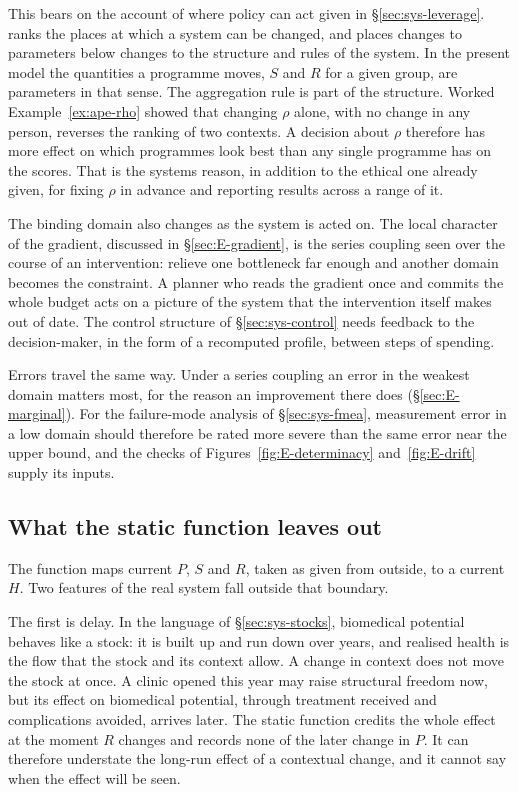 This bears on the account of where policy can act given in
\S\ref{sec:sys-leverage}. \citet{meadows_1999} ranks the places at which a
system can be changed, and places changes to parameters below changes to the
structure and rules of the system. In the present model the quantities a
programme moves, $S$ and $R$ for a given group, are parameters in that sense.
The aggregation rule is part of the structure. Worked Example~\ref{ex:ape-rho}
showed that changing $\rho$ alone, with no change in any person, reverses the
ranking of two contexts. A decision about $\rho$ therefore has more effect on
which programmes look best than any single programme has on the scores. That
is the systems reason, in addition to the ethical one already given, for fixing
$\rho$ in advance and reporting results across a range of it.

The binding domain also changes as the system is acted on. The local character
of the gradient, discussed in \S\ref{sec:E-gradient}, is the series coupling
seen over the course of an intervention: relieve one bottleneck far enough and
another domain becomes the constraint. A planner who reads the gradient once
and commits the whole budget acts on a picture of the system that the
intervention itself makes out of date. The control structure of
\S\ref{sec:sys-control} needs feedback to the decision-maker, in the form of a
recomputed profile, between steps of spending.

Errors travel the same way. Under a series coupling an error in the weakest
domain matters most, for the reason an improvement there does
(\S\ref{sec:E-marginal}). For the failure-mode analysis of
\S\ref{sec:sys-fmea}, measurement error in a low domain should therefore be
rated more severe than the same error near the upper bound, and the checks of
Figures~\ref{fig:E-determinacy} and~\ref{fig:E-drift} supply its inputs.

\subsection{What the static function leaves out}
The function maps current $P$, $S$ and $R$, taken as given from outside, to a
current $H$. Two features of the real system fall outside that boundary.

The first is delay. In the language of \S\ref{sec:sys-stocks}, biomedical
potential behaves like a stock: it is built up and run down over years, and
realised health is the flow that the stock and its context allow. A change in
context does not move the stock at once. A clinic opened this year may raise
structural freedom now, but its effect on biomedical potential, through
treatment received and complications avoided, arrives later. The static
function credits the whole effect at the moment $R$ changes and records none of
the later change in $P$. It can therefore understate the long-run effect of a
contextual change, and it cannot say when the effect will be seen.

